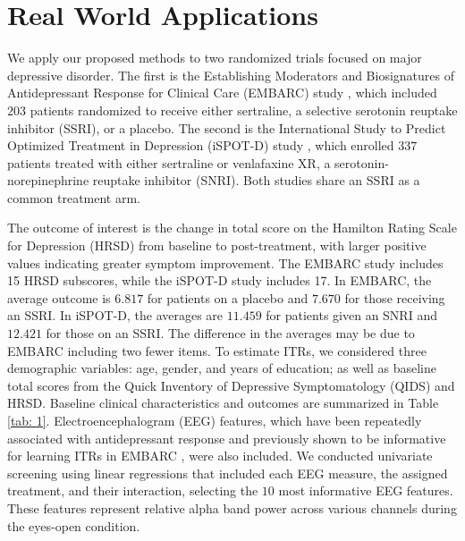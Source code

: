 \documentclass[12pt]{article}
\begin{document}
\section{Real World Applications}\label{sec: re}
We apply our proposed methods to two randomized trials focused on major depressive disorder. The first is the Establishing Moderators and Biosignatures of Antidepressant Response for Clinical Care (EMBARC) study \citep{trivedi2016establishing}, which included $203$ patients randomized to receive either sertraline, a selective serotonin reuptake inhibitor (SSRI), or a placebo. The second is the International Study to Predict Optimized Treatment in Depression (iSPOT-D) study \citep{williams2011international}, which enrolled $337$ patients treated with either sertraline or venlafaxine XR, a serotonin-norepinephrine reuptake inhibitor (SNRI). Both studies share an SSRI as a common treatment arm.

The outcome of interest is the change in total score on the Hamilton Rating Scale for Depression (HRSD) from baseline to post-treatment, with larger positive values indicating greater symptom improvement. The EMBARC study includes 15 HRSD subscores, while the iSPOT-D study includes 17. In EMBARC, the average outcome is $6.817$ for patients on a placebo and $7.670$ for those receiving an SSRI. In iSPOT-D, the averages are $11.459$ for patients given an SNRI and $12.421$ for those on an SSRI. The difference in the averages may be due to EMBARC including two fewer items. To estimate ITRs, we considered three demographic variables: age, gender, and years of education; as well as baseline total scores from the Quick Inventory of Depressive Symptomatology (QIDS) and HRSD. Baseline clinical characteristics and outcomes are summarized in Table \ref{tab: 1}. Electroencephalogram (EEG) features, which have been repeatedly associated with antidepressant response \citep{bruder2013electrophysiological} and previously shown to be informative for learning ITRs in EMBARC \citep{yang2024learning}, were also included. We conducted univariate screening using linear regressions that included each EEG measure, the assigned treatment, and their interaction, selecting the $10$ most informative EEG features. These features represent relative alpha band power across various channels during the eyes-open condition.  
\end{document}
